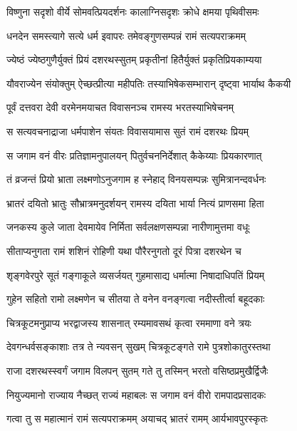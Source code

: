 \twolineshloka
{विष्णुना सदृशो वीर्ये सोमवत्प्रियदर्शनः}
{कालाग्निसदृशः क्रोधे क्षमया पृथिवीसमः} %

\twolineshloka
{धनदेन समस्त्यागे सत्ये धर्म इवापरः}
{तमेवङ्गुणसम्पन्नं रामं सत्यपराक्रमम्} %

\twolineshloka
{ज्येष्ठं ज्येष्ठगुणैर्युक्तं प्रियं दशरथस्सुतम्}
{प्रकृतीनां हितैर्युक्तं प्रकृतिप्रियकाम्यया} %

\twolineshloka
{यौवराज्येन संयोक्तुम् ऐच्छत्प्रीत्या महीपतिः}
{तस्याभिषेकसम्भारान् दृष्ट्वा भार्याथ कैकयी} %

\twolineshloka
{पूर्वं दत्तवरा देवी वरमेनमयाचत}
{विवासनञ्च रामस्य भरतस्याभिषेचनम्} %

\twolineshloka
{स सत्यवचनाद्राजा धर्मपाशेन संयतः}
{विवासयामास सुतं रामं दशरथः प्रियम्} %

\twolineshloka
{स जगाम वनं वीरः प्रतिज्ञामनुपालयन्}
{पितुर्वचननिर्देशात् कैकेय्याः प्रियकारणात्} %

\twolineshloka
{तं व्रजन्तं प्रियो भ्राता लक्ष्मणोऽनुजगाम ह}
{स्नेहाद् विनयसम्पन्नः सुमित्रानन्दवर्धनः} %

\twolineshloka
{भ्रातरं दयितो भ्रातुः सौभ्रात्रमनुदर्शयन्}
{रामस्य दयिता भार्या नित्यं प्राणसमा हिता} %

\twolineshloka
{जनकस्य कुले जाता देवमायेव निर्मिता}
{सर्वलक्षणसम्पन्ना नारीणामुत्तमा वधूः} %

\twolineshloka
{सीताप्यनुगता रामं शशिनं रोहिणी यथा}
{पौरैरनुगतो दूरं पित्रा दशरथेन च} %

\twolineshloka
{शृङ्गवेरपुरे सूतं गङ्गाकूले व्यसर्जयत्}
{गुहमासाद्य धर्मात्मा निषादाधिपतिं प्रियम्} %

\twolineshloka
{गुहेन सहितो रामो लक्ष्मणेन च सीतया}
{ते वनेन वनङ्गत्वा नदीस्तीर्त्वा बहूदकाः} %

\twolineshloka
{चित्रकूटमनुप्राप्य भरद्वाजस्य शासनात्}
{रम्यमावसथं कृत्वा रममाणा वने त्रयः} %

\twolineshloka
{देवगन्धर्वसङ्काशाः तत्र ते न्यवसन् सुखम्}
{चित्रकूटङ्गते रामे पुत्रशोकातुरस्तथा} %

\twolineshloka
{राजा दशरथस्स्वर्गं जगाम विलपन् सुतम्}
{गते तु तस्मिन् भरतो वसिष्ठप्रमुखैर्द्विजैः} %

\twolineshloka
{नियुज्यमानो राज्याय नैच्छत् राज्यं महाबलः}
{स जगाम वनं वीरो रामपादप्रसादकः} %

\twolineshloka
{गत्वा तु स महात्मानं रामं सत्यपराक्रमम्}
{अयाचद् भ्रातरं रामम् आर्यभावपुरस्कृतः} %

